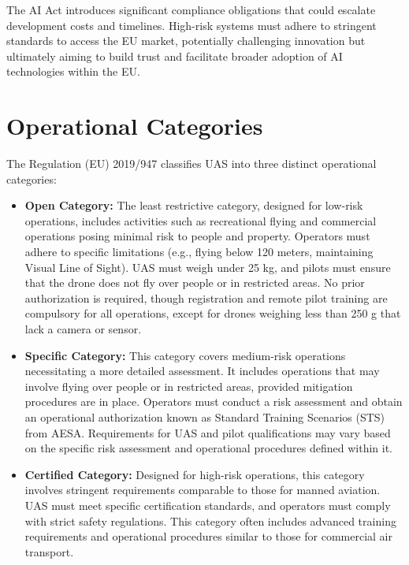 The AI Act introduces significant compliance obligations that could escalate development costs and timelines. High-risk systems must adhere to stringent standards to access the EU market, potentially challenging innovation but ultimately aiming to build trust and facilitate broader adoption of AI technologies within the EU.

\section{Operational Categories}
The Regulation (EU) 2019/947 \autocite{eu-947-2019} classifies UAS into three distinct operational categories:

\begin{itemize}
  \item \textbf{Open Category:} The least restrictive category, designed for low-risk operations, includes activities such as recreational flying and commercial operations posing minimal risk to people and property. Operators must adhere to specific limitations (e.g., flying below 120 meters, maintaining Visual Line of Sight). UAS must weigh under 25 kg, and pilots must ensure that the drone does not fly over people or in restricted areas. No prior authorization is required, though registration and remote pilot training are compulsory for all operations, except for drones weighing less than 250 g that lack a camera or sensor.

  \item \textbf{Specific Category:} This category covers medium-risk operations necessitating a more detailed assessment. It includes operations that may involve flying over people or in restricted areas, provided mitigation procedures are in place. Operators must conduct a risk assessment and obtain an operational authorization known as Standard Training Scenarios (STS) from AESA. Requirements for UAS and pilot qualifications may vary based on the specific risk assessment and operational procedures defined within it.

  \item \textbf{Certified Category:} Designed for high-risk operations, this category involves stringent requirements comparable to those for manned aviation. UAS must meet specific certification standards, and operators must comply with strict safety regulations. This category often includes advanced training requirements and operational procedures similar to those for commercial air transport.
\end{itemize}

